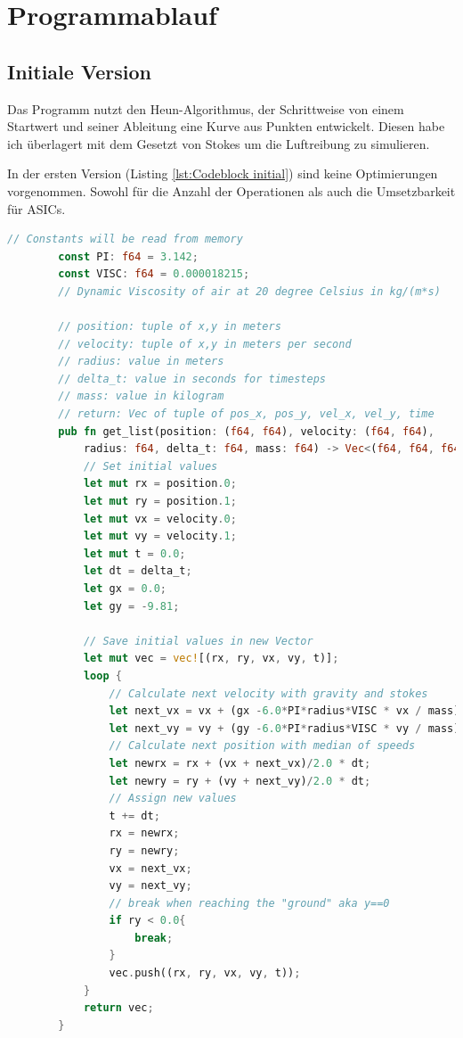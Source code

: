 \documentclass{article}
\begin{document}
    \section{Programmablauf}

    \subsection{Initiale Version}

    Das Programm nutzt den Heun-Algorithmus, der Schrittweise von einem Startwert und seiner Ableitung eine Kurve aus
    Punkten entwickelt.
    Diesen habe ich überlagert mit dem Gesetzt von Stokes um die Luftreibung zu simulieren.

    \newblock

    In der ersten Version (Listing \ref{lst:Codeblock initial}) sind keine Optimierungen vorgenommen. Sowohl für die Anzahl
    der Operationen als auch die Umsetzbarkeit für ASICs.

    \newpage

    \begin{lstlisting}[language=Rust, caption={Initialer Code.}, label=lst:Codeblock initial]
        // Constants will be read from memory
        const PI: f64 = 3.142;
        const VISC: f64 = 0.000018215;
        // Dynamic Viscosity of air at 20 degree Celsius in kg/(m*s)

        // position: tuple of x,y in meters
        // velocity: tuple of x,y in meters per second
        // radius: value in meters
        // delta_t: value in seconds for timesteps
        // mass: value in kilogram
        // return: Vec of tuple of pos_x, pos_y, vel_x, vel_y, time
        pub fn get_list(position: (f64, f64), velocity: (f64, f64),
            radius: f64, delta_t: f64, mass: f64) -> Vec<(f64, f64, f64, f64, f64)>{
            // Set initial values
            let mut rx = position.0;
            let mut ry = position.1;
            let mut vx = velocity.0;
            let mut vy = velocity.1;
            let mut t = 0.0;
            let dt = delta_t;
            let gx = 0.0;
            let gy = -9.81;

            // Save initial values in new Vector
            let mut vec = vec![(rx, ry, vx, vy, t)];
            loop {
                // Calculate next velocity with gravity and stokes
                let next_vx = vx + (gx -6.0*PI*radius*VISC * vx / mass)*dt;
                let next_vy = vy + (gy -6.0*PI*radius*VISC * vy / mass)*dt;
                // Calculate next position with median of speeds
                let newrx = rx + (vx + next_vx)/2.0 * dt;
                let newry = ry + (vy + next_vy)/2.0 * dt;
                // Assign new values
                t += dt;
                rx = newrx;
                ry = newry;
                vx = next_vx;
                vy = next_vy;
                // break when reaching the "ground" aka y==0
                if ry < 0.0{
                    break;
                }
                vec.push((rx, ry, vx, vy, t));
            }
            return vec;
        }
    \end{lstlisting}
\end{document}
